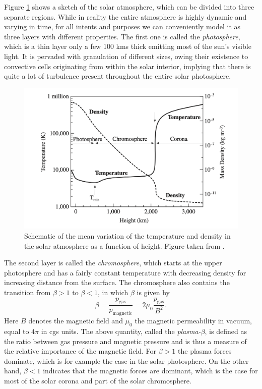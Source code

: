 Figure \ref{fig: solar_profile} shows a sketch of the solar atmosphere, which can be divided into three separate regions. While in reality the entire atmosphere is highly dynamic and varying in time, for all intents and purposes we can conveniently model it as three layers with different properties. The first one is called the \emph{photosphere}, which is a thin layer only a few 100 kms thick emitting most of the sun's visible light. It is pervaded with granulation of different sizes, owing their existence to convective cells originating from within the solar interior, implying that there is quite a lot of turbulence present throughout the entire solar photosphere.
\begin{figure}[t]
  \centering
  \includegraphics[width=\textwidth]{solar_profile.png}
  \caption{
    Schematic of the mean variation of the temperature and density in the solar atmosphere as a function of height.
    Figure taken from \citet{book_priest}.
  }
  \label{fig: solar_profile}
\end{figure}

The second layer is called the \emph{chromosphere}, which starts at the upper photosphere and has a fairly constant temperature with decreasing density for increasing distance from the surface. The chromosphere also contains the transition from $\beta > 1$ to $\beta < 1$, in which $\beta$ is given by
\begin{equation} \label{eq: plasma_beta}
  \beta = \frac{p_\text{gas}}{p_\text{magnetic}} = 2\mu_0 \frac{p_\text{gas}}{B^2}.
\end{equation}
Here $B$ denotes the magnetic field and $\mu_0$ the magnetic permeability in vacuum, equal to $4\pi$ in cgs units. The above quantity, called the \emph{plasma-$\beta$}, is defined as the ratio between gas pressure and magnetic pressure and is thus a measure of the relative importance of the magnetic field. For $\beta > 1$ the plasma forces dominate, which is for example the case in the solar photosphere. On the other hand, $\beta < 1$ indicates that the magnetic forces are dominant, which is the case for most of the solar corona and part of the solar chromosphere.

